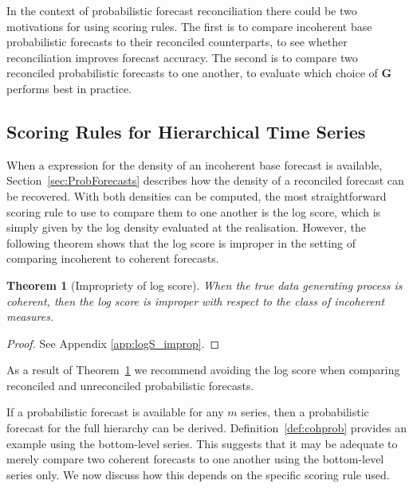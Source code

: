 \documentclass[12pt]{article}
\newtheorem{theo}{Theorem}[section]
\theoremstyle{definition}
\begin{document}
In the context of probabilistic forecast reconciliation there could be two motivations for using scoring rules. The first is to compare incoherent base probabilistic forecasts to their reconciled counterparts, to see whether reconciliation improves forecast accuracy. The second is to compare two reconciled probabilistic forecasts to one another, to evaluate which choice of $\bm{G}$ performs best in practice.

\subsection{Scoring Rules for Hierarchical Time Series}

When a expression for the density of an incoherent base forecast is available, Section~\ref{sec:ProbForecasts} describes how the density of a reconciled forecast can be recovered.  With both densities can be computed, the most straightforward scoring rule to use to compare them to one another is the log score, which is simply given by the log density evaluated at the realisation.  However, the following theorem shows that the log score is improper in the setting of comparing incoherent to coherent forecasts.

\begin{theo}[Impropriety of log score]\label{theo:logS_improp}
	When the true data generating process is coherent, then the log score is improper with respect to the class of incoherent measures.
\end{theo}

\begin{proof}
	See Appendix \ref{app:logS_improp}.
\end{proof}

As a result of Theorem~\ref{theo:logS_improp} we recommend avoiding the log score when comparing reconciled and unreconciled probabilistic forecasts.

If a probabilistic forecast is available for any $m$ series, then a probabilistic forecast for the full hierarchy can be derived.  Definition~\ref{def:cohprob} provides an example using the bottom-level series. This suggests that it may be adequate to merely compare two coherent forecasts to one another using the bottom-level series only. We now discuss how this depends on the specific scoring rule used.
\end{document}
